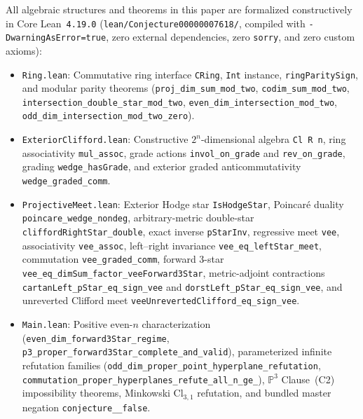 \documentclass[11pt]{article}
\theoremstyle{definition}
\newcommand{\Cl}{\mathrm{Cl}}
\newcommand{\Proj}{\mathbb{P}}
\begin{document}
All algebraic structures and theorems in this paper are formalized constructively in Core Lean~\texttt{4.19.0} (\texttt{lean/Conjecture00000007618/}, compiled with \texttt{-DwarningAsError=true}, zero external dependencies, zero \texttt{sorry}, and zero custom axioms):
\begin{itemize}\raggedright
\item \texttt{Ring.lean}: Commutative ring interface \texttt{CRing}, \texttt{Int} instance, \texttt{ringParitySign}, and modular parity theorems (\texttt{proj\_\allowbreak dim\_\allowbreak sum\_\allowbreak mod\_\allowbreak two}, \texttt{codim\_\allowbreak sum\_\allowbreak mod\_\allowbreak two}, \texttt{intersection\_\allowbreak double\_\allowbreak star\_\allowbreak mod\_\allowbreak two}, \texttt{even\_\allowbreak dim\_\allowbreak intersection\_\allowbreak mod\_\allowbreak two}, \texttt{odd\_\allowbreak dim\_\allowbreak intersection\_\allowbreak mod\_\allowbreak two\_\allowbreak zero}).
\item \texttt{ExteriorClifford.lean}: Constructive $2^n$-dimensional algebra \texttt{Cl R n}, ring associativity \texttt{mul\_\allowbreak assoc}, grade actions \texttt{invol\_\allowbreak on\_\allowbreak grade} and \texttt{rev\_\allowbreak on\_\allowbreak grade}, grading \texttt{wedge\_\allowbreak hasGrade}, and exterior graded anticommutativity \texttt{wedge\_\allowbreak graded\_\allowbreak comm}.
\item \texttt{ProjectiveMeet.lean}: Exterior Hodge star \texttt{IsHodgeStar}, Poincar\'e duality \texttt{poincare\_\allowbreak wedge\_\allowbreak nondeg}, arbitrary-metric double-star \texttt{cliffordRightStar\_\allowbreak double}, exact inverse \texttt{pStarInv}, regressive meet \texttt{vee}, associativity \texttt{vee\_\allowbreak assoc}, left--right invariance \texttt{vee\_\allowbreak eq\_\allowbreak leftStar\_\allowbreak meet}, commutation \texttt{vee\_\allowbreak graded\_\allowbreak comm}, forward 3-star \texttt{vee\_\allowbreak eq\_\allowbreak dimSum\_\allowbreak factor\_\allowbreak veeForward3Star}, metric-adjoint contractions \texttt{cartanLeft\_\allowbreak pStar\_\allowbreak eq\_\allowbreak sign\_\allowbreak vee} and \texttt{dorstLeft\_\allowbreak pStar\_\allowbreak eq\_\allowbreak sign\_\allowbreak vee}, and unreverted Clifford meet \texttt{veeUnrevertedClifford\_\allowbreak eq\_\allowbreak sign\_\allowbreak vee}.
\item \texttt{Main.lean}: Positive even-$n$ characterization (\texttt{even\_\allowbreak dim\_\allowbreak forward3Star\_\allowbreak regime}, \texttt{p3\_\allowbreak proper\_\allowbreak forward3Star\_\allowbreak complete\_\allowbreak and\_\allowbreak valid}), parameterized infinite refutation families (\texttt{odd\_\allowbreak dim\_\allowbreak proper\_\allowbreak point\_\allowbreak hyperplane\_\allowbreak refutation}, \texttt{commutation\_\allowbreak proper\_\allowbreak hyperplanes\_\allowbreak refute\_\allowbreak all\_\allowbreak n\_\allowbreak ge\_}), $\Proj^3$ Clause~(C2) impossibility theorems, Minkowski $\Cl_{3,1}$ refutation, and bundled master negation \texttt{conjecture\_\_\allowbreak false}.
\end{itemize}
\end{document}
